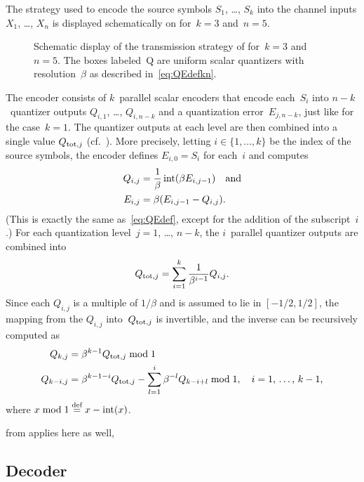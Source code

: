 The strategy used to encode the source symbols $S_1$, \dots, $S_k$ into the
channel inputs $X_1$, \dots, $X_n$ is displayed schematically on
 for~$k=3$ and~$n=5$. 
\begin{figure}[tbp]
  \begin{center}
    
  \end{center}
  \caption{Schematic display of the transmission strategy of 
  for~$k = 3$ and~$n=5$. The boxes labeled~\textsf{Q} are uniform scalar
  quantizers with resolution~$\beta$ as described in~\eqref{eq:QEdefkn}.}
  \label{fig:knencoding}
\end{figure}
The encoder consists of $k$~parallel scalar encoders that encode each~$S_i$ into
$n-k$~quantizer outputs $Q_{i,1}$, \dots, $Q_{i,n-k}$ and a quantization
error~$E_{j,n-k}$, just like for the case~$k=1$. The quantizer outputs at each
level are then combined into a single value $Q_{\operatorname{tot},j}$
(cf.~). More precisely, letting $i \in \{1, \dots, k\}$ be
the index of the source symbols, the encoder defines $E_{i,0} = S_i$ for
each~$i$ and computes
\begin{align}
  Q_{i,j} &= \frac{1}{\beta} \operatorname{int}(\beta E_{i,j-1}) \quad\text{and} \nonumber \\
  E_{i,j} &= \beta(E_{i,j-1} - Q_{i,j}). \label{eq:QEdefkn}
\end{align}
(This is exactly the same as~\eqref{eq:QEdef}, except for the addition of the
subscript~$i$.) For each quantization level~$j = 1$, \dots, $n-k$, the
$i$~parallel quantizer outputs are combined into
\begin{equation}
  \label{eq:Qtot}
  Q_{\operatorname{tot},j} = \sum_{i=1}^k \frac{1}{\beta^{i-1}} Q_{i,j}.
\end{equation}
Since each $Q_{i,j}$ is a multiple of $1/\beta$ and is assumed to lie in $[-1/2,
1/2]$, the mapping from the $Q_{i,j}$ into~$Q_{\operatorname{tot},j}$ is invertible, and the
inverse can be recursively computed as
\begin{align}
  Q_{k,j} &= \beta^{k-1} Q_{\operatorname{tot},j} \bmod 1 \nonumber \\
  Q_{k-i,j} &= \beta^{k-1-i} Q_{\operatorname{tot},j} - \sum_{l = 1}^i \beta^{-l} Q_{k - i +
  l} \bmod 1, \quad\text{$i = 1$, \dots, $k-1$,} 
  \label{eq:Qtotinv}
\end{align}
where $x \bmod 1 \stackrel{\text{def}}{=} x - \operatorname{int}(x)$.

 from  applies here as well, 


\subsection{Decoder}

